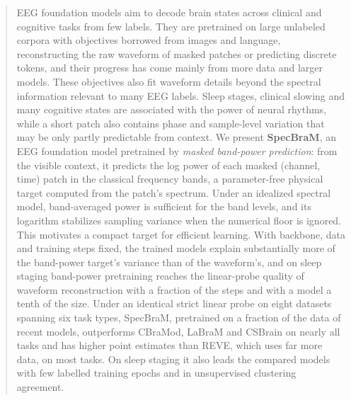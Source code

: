 \begin{abstract}
EEG foundation models aim to decode brain states across clinical and cognitive tasks from few
labels. They are pretrained on large unlabeled corpora with objectives borrowed from images and
language, reconstructing the raw waveform of masked patches or predicting discrete tokens, and
their progress has come mainly from more data and larger models. These objectives also fit
waveform details beyond the spectral information relevant to many EEG labels. Sleep stages,
clinical slowing and many cognitive states are associated with the power of neural rhythms,
while a short patch also contains phase and sample-level variation that may be only partly
predictable from context. We present \textbf{SpecBraM}, an EEG foundation model pretrained by
\emph{masked band-power prediction}: from the visible context, it predicts the log power of each
masked (channel, time) patch in the classical frequency bands, a parameter-free physical target
computed from the patch's spectrum. Under an idealized spectral model, band-averaged power is
sufficient for the band levels, and its logarithm stabilizes sampling variance when the numerical
floor is ignored. This motivates a compact target for efficient learning. With backbone, data
and training steps fixed, the trained models explain substantially more of the band-power
target's variance than of the waveform's, and on sleep staging band-power pretraining reaches
the linear-probe quality of waveform reconstruction with a fraction of the steps and with a
model a tenth of the size. Under an identical strict linear probe on eight datasets spanning six task types,
SpecBraM, pretrained on a fraction of the data of recent models, outperforms CBraMod, LaBraM
and CSBrain on nearly all tasks and has higher point estimates than REVE, which uses far more
data, on most tasks. On sleep staging it also leads the compared models with few labelled
training epochs and in unsupervised clustering agreement.
\end{abstract}
